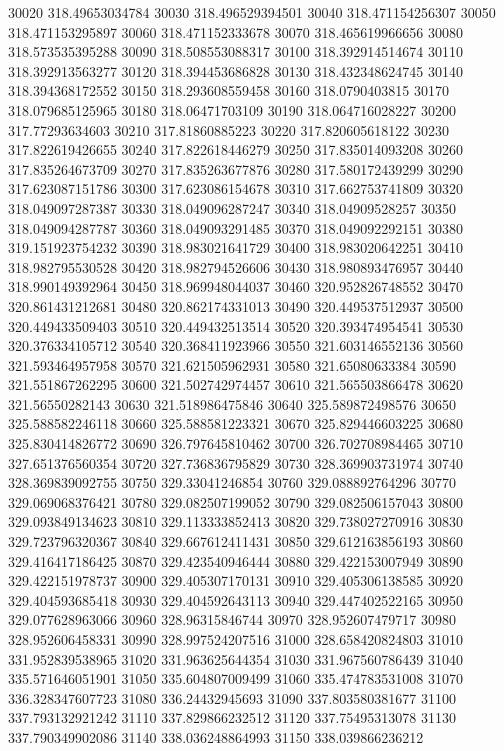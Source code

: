 {30020 318.49653034784
30030 318.496529394501
30040 318.471154256307
30050 318.471153295897
30060 318.471152333678
30070 318.465619966656
30080 318.573535395288
30090 318.508553088317
30100 318.392914514674
30110 318.392913563277
30120 318.394453686828
30130 318.432348624745
30140 318.394368172552
30150 318.293608559458
30160 318.0790403815
30170 318.079685125965
30180 318.06471703109
30190 318.064716028227
30200 317.77293634603
30210 317.81860885223
30220 317.820605618122
30230 317.822619426655
30240 317.822618446279
30250 317.835014093208
30260 317.835264673709
30270 317.835263677876
30280 317.580172439299
30290 317.623087151786
30300 317.623086154678
30310 317.662753741809
30320 318.049097287387
30330 318.049096287247
30340 318.04909528257
30350 318.049094287787
30360 318.049093291485
30370 318.049092292151
30380 319.151923754232
30390 318.983021641729
30400 318.983020642251
30410 318.982795530528
30420 318.982794526606
30430 318.980893476957
30440 318.990149392964
30450 318.969948044037
30460 320.952826748552
30470 320.861431212681
30480 320.862174331013
30490 320.449537512937
30500 320.449433509403
30510 320.449432513514
30520 320.393474954541
30530 320.376334105712
30540 320.368411923966
30550 321.603146552136
30560 321.593464957958
30570 321.621505962931
30580 321.65080633384
30590 321.551867262295
30600 321.502742974457
30610 321.565503866478
30620 321.56550282143
30630 321.518986475846
30640 325.589872498576
30650 325.588582246118
30660 325.588581223321
30670 325.829446603225
30680 325.830414826772
30690 326.797645810462
30700 326.702708984465
30710 327.651376560354
30720 327.736836795829
30730 328.369903731974
30740 328.369839092755
30750 329.33041246854
30760 329.088892764296
30770 329.069068376421
30780 329.082507199052
30790 329.082506157043
30800 329.093849134623
30810 329.113333852413
30820 329.738027270916
30830 329.723796320367
30840 329.667612411431
30850 329.612163856193
30860 329.416417186425
30870 329.423540946444
30880 329.422153007949
30890 329.422151978737
30900 329.405307170131
30910 329.405306138585
30920 329.404593685418
30930 329.404592643113
30940 329.447402522165
30950 329.077628963066
30960 328.96315846744
30970 328.952607479717
30980 328.952606458331
30990 328.997524207516
31000 328.658420824803
31010 331.952839538965
31020 331.963625644354
31030 331.967560786439
31040 335.571646051901
31050 335.604807009499
31060 335.474783531008
31070 336.328347607723
31080 336.24432945693
31090 337.803580381677
31100 337.793132921242
31110 337.829866232512
31120 337.75495313078
31130 337.790349902086
31140 338.036248864993
31150 338.039866236212
}
